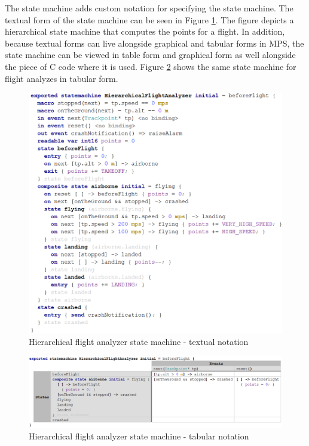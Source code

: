 \documentclass[preprint,numbers,10pt]{sigplanconf}
\begin{document}
The state machine adds custom notation for specifying the state machine. The textual
form of the state machine can be seen in Figure \ref{fig:HFAT}. The figure depicts a hierarchical state machine
that computes the points for a flight.
In addition, because textual forms can live alongside graphical and tabular forms in MPS, 
the state machine can be viewed in table form and graphical form as well alongside the piece of C code
where it is used. Figure \ref{fig:HFATab} shows the same state machine for flight analyzes in tabular form.

\begin{figure}[ht!]
	\centering
	\includegraphics[scale=0.5]{screens/HierarchicalFlightAnalyzerT}
	\caption{Hierarchical flight analyzer state machine - textual notation}
	\label{fig:HFAT}
\end{figure}

\begin{figure}[ht!]
	\centering
	\includegraphics[scale=0.55]{screens/HierarchicalFlightAnalyzerTab}
	\caption{Hierarchical flight analyzer state machine - tabular notation}
	\label{fig:HFATab}
\end{figure}
\end{document}
